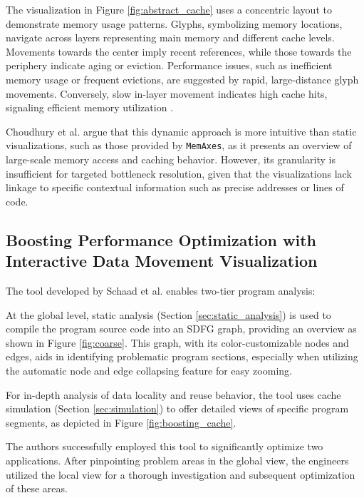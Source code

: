 The visualization in Figure \ref{fig:abstract_cache} uses a concentric layout to demonstrate memory usage patterns. Glyphs, symbolizing memory locations, navigate across layers representing main memory and different cache levels. Movements towards the center imply recent references, while those towards the periphery indicate aging or eviction. Performance issues, such as inefficient memory usage or frequent evictions, are suggested by rapid, large-distance glyph movements. Conversely, slow in-layer movement indicates high cache hits, signaling efficient memory utilization \cite{choudhury2011abstract}.

Choudhury et al. argue that this dynamic approach is more intuitive than static visualizations, such as those provided by \texttt{MemAxes}, as it presents an overview of large-scale memory access and caching behavior. However, its granularity is insufficient for targeted bottleneck resolution, given that the visualizations lack linkage to specific contextual information such as precise addresses or lines of code.

\subsection{Boosting Performance Optimization with Interactive Data Movement Visualization}\label{sec:boosting}
The tool developed by Schaad et al. \cite{schaad2021boosting,schaad2022boosting} enables two-tier program analysis:

At the global level, static analysis (Section \ref{sec:static_analysis}) is used to compile the program source code into an SDFG graph, providing an overview as shown in Figure \ref{fig:coarse}. This graph, with its color-customizable nodes and edges, aids in identifying problematic program sections, especially when utilizing the automatic node and edge collapsing feature for easy zooming.

For in-depth analysis of data locality and reuse behavior, the tool uses cache simulation (Section \ref{sec:simulation}) to offer detailed views of specific program segments, as depicted in Figure \ref{fig:boosting_cache}.

The authors successfully employed this tool to significantly optimize two applications. After pinpointing problem areas in the global view, the engineers utilized the local view for a thorough investigation and subsequent optimization of these areas.

